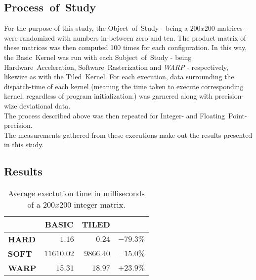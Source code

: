 \documentclass[fleqn,10pt]{SelfArx} %
\begin{document}
\subsection{Process~of~Study}
\label{sec:contribution:processofstudy}
For the purpose of this study, the Object~of~Study - being a $200x200$ matrices - were randomized with numbers in-between zero and ten. The product matrix of these matrices was then computed 100 times for each configuration. In this way, the Basic~Kernel was run with each Subject~of~Study - being Hardware~Acceleration, Software~Rasterization and \textit{WARP} - respectively, likewize as with the Tiled~Kernel. For each execution, data surrounding the dispatch-time of each kernel (meaning the time taken to execute corresponding kernel, regardless of program initialization.) was garnered along with precision-wize deviational data.\\
The process described above was then repeated for Integer- and Floating~Point-precision.\\

\noindent
The measurements gathered from these executions make out the results presented in this study.

\subsection{Results}
\label{sec:contribution:results}

\begin{table}[h]
\begin{center}
\begin{tabular}{r|r|r|r|}
	\cline{2-3}
							& \multicolumn{1}{|c|}{\textbf{BASIC}} & \multicolumn{1}{|c|}{\textbf{TILED}}	\\ \hline
	\multicolumn{1}{|l|}{\textbf{HARD}}	& $1.16$			& $0.24$ 	& $-79.3\%$    				\\ \hline
	\multicolumn{1}{|l|}{\textbf{SOFT}}	& $11610.02$		& $9866.40$	& $-15.0\%$     				\\ \hline
	\multicolumn{1}{|l|}{\textbf{WARP}}	& $15.31$			& $18.97$	& $+23.9\%$     				\\ \hline
\end{tabular}
\label{tab:contribution:results:summaryint}
\caption{Average exectution time in milliseconds of a $200x200$ integer matrix.}
\end{center}
\end{table}
\end{document}
